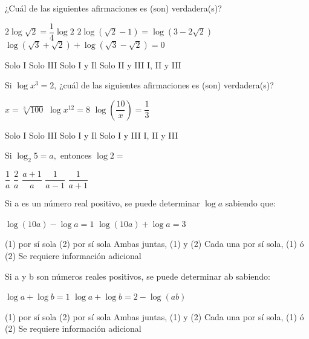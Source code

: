 \documentclass[pagina vacia]{srs}
\begin{document}
\begin{preguntas}
\pregunta ¿Cuál de las siguientes afirmaciones es (son) verdadera(s)?
\begin{verticali}
\alternativa $2 \log\sqrt{2}=\dfrac{1}{4}\log 2$
\alternativa $2 \log\left(\sqrt{2}-1\right)=\log\left(3-2\sqrt{2}\right)$
\alternativa $\log\left(\sqrt{3}+\sqrt{2}\right)+\log\left(\sqrt{3}-\sqrt{2}\right)=0$
\end{verticali}
\begin{vertical}
\alternativa Solo I
\alternativa Solo III
\alternativa Solo I y Il
\alternativa Solo II y III
\alternativa I, II y III
\end{vertical}

\pregunta Si $\log x^{3}=2$, ¿cuál de las siguientes afirmaciones es (son) verdadera(s)?
\begin{verticali}
\alternativa $x=\sqrt[3]{100}$
\alternativa $\log x^{12}=8$
\alternativa $\log\left(\dfrac{10}{x}\right)=\dfrac{1}{3}$
\end{verticali}
\begin{vertical}
\alternativa Solo I
\alternativa Solo III
\alternativa Solo I y Il
\alternativa Solo I y III
\alternativa I, II y III
\end{vertical}

\pregunta Si $\log_{2}5=a,$ entonces $\log 2=$
\begin{vertical}
\alternativa $\dfrac{1}{a}$
\alternativa $\dfrac{2}{a}$
\alternativa $\dfrac{a+1}{a}$
\alternativa $\dfrac{1}{a-1}$
\alternativa $\dfrac{1}{a+1}$
\end{vertical}

\pregunta Si a es un número real positivo, se puede determinar $\log a$ sabiendo que:
\begin{verticaln}
\alternativa $\log\left(10a\right)-\log a=1$
\alternativa $\log\left(10a\right)+\log a=3$
\end{verticaln}
\begin{vertical}
\alternativa (1) por sí sola
\alternativa (2) por sí sola
\alternativa Ambas juntas, (1) y (2)
\alternativa Cada una por sí sola, (1) ó (2)
\alternativa Se requiere información adicional
\end{vertical}

\pregunta Si a y b son números reales positivos, se puede determinar ab sabiendo:
\begin{verticaln}
\alternativa $\log a+\log b=1$
\alternativa $\log a+\log b=2-\log\left(ab\right)$
\end{verticaln}
\begin{vertical}
\alternativa (1) por sí sola
\alternativa (2) por sí sola
\alternativa Ambas juntas, (1) y (2)
\alternativa Cada una por sí sola, (1) ó (2)
\alternativa Se requiere información adicional
\end{vertical}
\end{preguntas}
\end{document}
